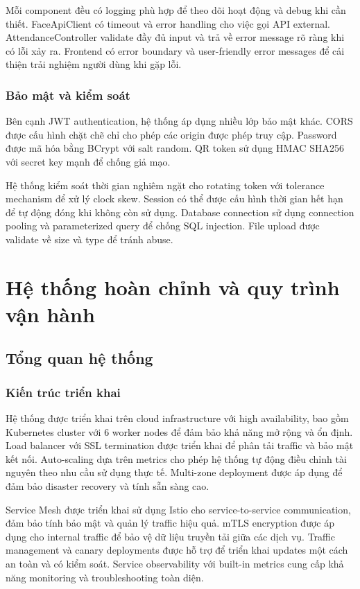 \documentclass[12pt,a4paper]{report}
\begin{document}
Mỗi component đều có logging phù hợp để theo dõi hoạt động và debug khi cần thiết. FaceApiClient có timeout và error handling cho việc gọi API external. AttendanceController validate đầy đủ input và trả về error message rõ ràng khi có lỗi xảy ra. Frontend có error boundary và user-friendly error messages để cải thiện trải nghiệm người dùng khi gặp lỗi.

\subsection{Bảo mật và kiểm soát}
Bên cạnh JWT authentication, hệ thống áp dụng nhiều lớp bảo mật khác. CORS được cấu hình chặt chẽ chỉ cho phép các origin được phép truy cập. Password được mã hóa bằng BCrypt với salt random. QR token sử dụng HMAC SHA256 với secret key mạnh để chống giả mạo.

Hệ thống kiểm soát thời gian nghiêm ngặt cho rotating token với tolerance mechanism để xử lý clock skew. Session có thể được cấu hình thời gian hết hạn để tự động đóng khi không còn sử dụng. Database connection sử dụng connection pooling và parameterized query để chống SQL injection. File upload được validate về size và type để tránh abuse.

\chapter{Hệ thống hoàn chỉnh và quy trình vận hành}
\section{Tổng quan hệ thống}
\subsection{Kiến trúc triển khai}
Hệ thống được triển khai trên cloud infrastructure với high availability, bao gồm Kubernetes cluster với 6 worker nodes để đảm bảo khả năng mở rộng và ổn định. Load balancer với SSL termination được triển khai để phân tải traffic và bảo mật kết nối. Auto-scaling dựa trên metrics cho phép hệ thống tự động điều chỉnh tài nguyên theo nhu cầu sử dụng thực tế. Multi-zone deployment được áp dụng để đảm bảo disaster recovery và tính sẵn sàng cao.

Service Mesh được triển khai sử dụng Istio cho service-to-service communication, đảm bảo tính bảo mật và quản lý traffic hiệu quả. mTLS encryption được áp dụng cho internal traffic để bảo vệ dữ liệu truyền tải giữa các dịch vụ. Traffic management và canary deployments được hỗ trợ để triển khai updates một cách an toàn và có kiểm soát. Service observability với built-in metrics cung cấp khả năng monitoring và troubleshooting toàn diện.
\end{document}
